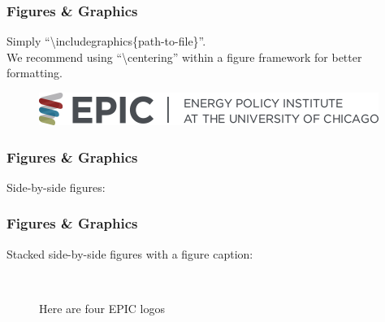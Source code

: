 \documentclass{beamer}
\begin{document}
\begin{frame}
\frametitle{Figures \& Graphics}
Simply ``\textbackslash includegraphics\{path-to-file\}''. 
\\[1em]
We recommend using ``\textbackslash centering'' within a figure framework for better formatting.
\vspace{1cm}
\begin{figure}
	\includegraphics[width=0.8\linewidth]{epic_logo}
\end{figure}
\end{frame}

\begin{frame}
\frametitle{Figures \& Graphics}
Side-by-side figures:
\begin{figure}[h]%
    \centering
    \quad
\end{figure}
\end{frame}

\begin{frame}
\frametitle{Figures \& Graphics}
Stacked side-by-side figures with a figure caption:
\begin{figure}[h]%
    \centering
    \quad
    \\[1em]
    \quad
    \vspace{0.2cm}
    \caption{Here are four EPIC logos}
\end{figure}
\end{frame}
\end{document}
